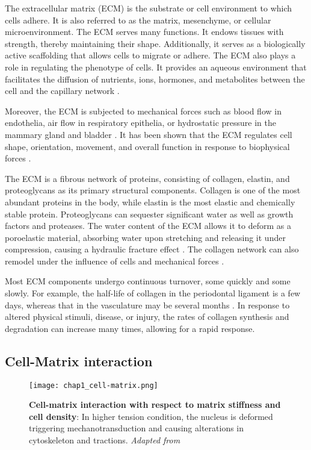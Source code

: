 The extracellular matrix (ECM) is the substrate or cell environment to which cells adhere. It is also referred to as the matrix, mesenchyme, or cellular microenvironment. The ECM serves many functions. It endows tissues with strength, thereby maintaining their shape. Additionally, it serves as a biologically active scaffolding that allows cells to migrate or adhere. The ECM also plays a role in regulating the phenotype of cells. It provides an aqueous environment that facilitates the diffusion of nutrients, ions, hormones, and metabolites between the cell and the capillary network \cite{alberts2015}.

Moreover, the ECM is subjected to mechanical forces such as blood flow in endothelia, air flow in respiratory epithelia, or hydrostatic pressure in the mammary gland and bladder \cite{waters2012, walma2020}. It has been shown that the ECM regulates cell shape, orientation, movement, and overall function in response to biophysical forces \cite{alberts2015}.

The ECM is a fibrous network of proteins, consisting of collagen, elastin, and proteoglycans as its primary structural components. Collagen is one of the most abundant proteins in the body, while elastin is the most elastic and chemically stable protein. Proteoglycans can sequester significant water as well as growth factors and proteases. The water content of the ECM allows it to deform as a poroelastic material, absorbing water upon stretching and releasing it under compression, causing a hydraulic fracture effect \cite{casares2015}. The collagen network can also remodel under the influence of cells and mechanical forces \cite{humphrey2014}.

Most ECM components undergo continuous turnover, some quickly and some slowly. For example, the half-life of collagen in the periodontal ligament is a few days, whereas that in the vasculature may be several months \cite{humphrey2014}. In response to altered physical stimuli, disease, or injury, the rates of collagen synthesis and degradation can increase many times, allowing for a rapid response.

\hypertarget{cell-matrix-interaction}{%
	\subsection{Cell-Matrix interaction}\label{cell-matrix-interaction}}

\begin{figure}
	\centering
	\texttt{[image: chap1\_cell-matrix.png]}
	\caption{\label{fig_1_4} \textbf{Cell-matrix interaction with respect to matrix stiffness and cell density}: In higher tension condition, the nucleus is deformed triggering mechanotransduction and causing alterations in cytoskeleton and tractions. \textit{Adapted from \cite{xi2018}}}
\end{figure}


